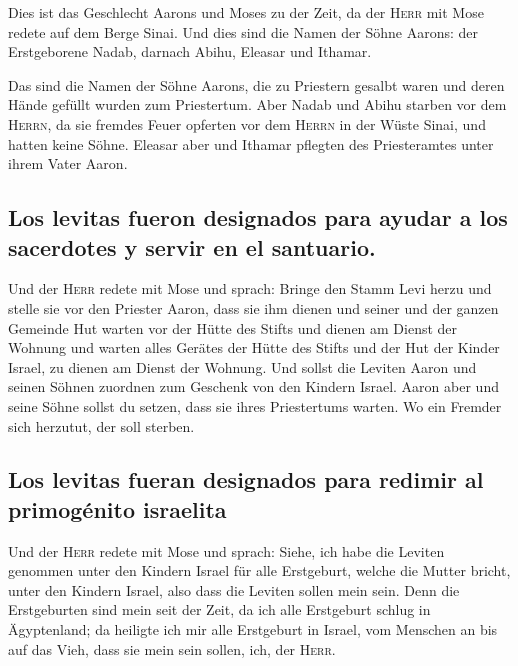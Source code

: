  Dies ist das Geschlecht Aarons und Moses zu der Zeit, da
der \textsc{Herr} mit Mose redete auf dem Berge Sinai. 
Und dies sind die Namen der Söhne Aarons: der Erstgeborene Nadab,
darnach Abihu, Eleasar und Ithamar.

 Das sind die Namen der Söhne Aarons, die zu Priestern
gesalbt waren und deren Hände gefüllt wurden zum Priestertum.
 Aber Nadab und Abihu starben vor dem \textsc{Herrn}, da
sie fremdes Feuer opferten vor dem \textsc{Herrn} in der Wüste Sinai,
und hatten keine Söhne. Eleasar aber und Ithamar pflegten des
Priesteramtes unter ihrem Vater Aaron.

\hypertarget{los-levitas-fueron-designados-para-ayudar-a-los-sacerdotes-y-servir-en-el-santuario.}{%
\subsection{Los levitas fueron designados para ayudar a los sacerdotes y
servir en el
santuario.}\label{los-levitas-fueron-designados-para-ayudar-a-los-sacerdotes-y-servir-en-el-santuario.}}

 Und der \textsc{Herr} redete mit Mose und sprach:
 Bringe den Stamm Levi herzu und stelle sie vor den
Priester Aaron, dass sie ihm dienen  und seiner und der
ganzen Gemeinde Hut warten vor der Hütte des Stifts und dienen am Dienst
der Wohnung  und warten alles Gerätes der Hütte des Stifts
und der Hut der Kinder Israel, zu dienen am Dienst der Wohnung.
 Und sollst die Leviten Aaron und seinen Söhnen zuordnen
zum Geschenk von den Kindern Israel.  Aaron aber und
seine Söhne sollst du setzen, dass sie ihres Priestertums warten. Wo ein
Fremder sich herzutut, der soll sterben.

\hypertarget{los-levitas-fueran-designados-para-redimir-al-primoguxe9nito-israelita}{%
\subsection{Los levitas fueran designados para redimir al primogénito
israelita}\label{los-levitas-fueran-designados-para-redimir-al-primoguxe9nito-israelita}}

 Und der \textsc{Herr} redete mit Mose und sprach:
 Siehe, ich habe die Leviten genommen unter den Kindern
Israel für alle Erstgeburt, welche die Mutter bricht, unter den Kindern
Israel, also dass die Leviten sollen mein sein.  Denn die
Erstgeburten sind mein seit der Zeit, da ich alle Erstgeburt schlug in
Ägyptenland; da heiligte ich mir alle Erstgeburt in Israel, vom Menschen
an bis auf das Vieh, dass sie mein sein sollen, ich, der \textsc{Herr}.

